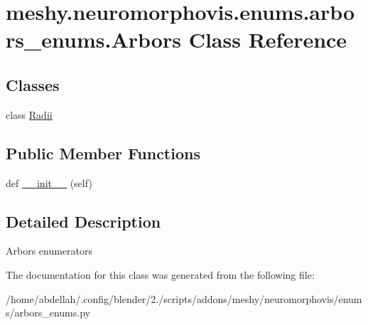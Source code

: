 \hypertarget{classmeshy_1_1neuromorphovis_1_1enums_1_1arbors__enums_1_1Arbors}{}\section{meshy.\+neuromorphovis.\+enums.\+arbors\+\_\+enums.\+Arbors Class Reference}
\label{classmeshy_1_1neuromorphovis_1_1enums_1_1arbors__enums_1_1Arbors}


 


\subsection*{Classes}
\begin{DoxyCompactItemize}
\item 
class \hyperlink{classmeshy_1_1neuromorphovis_1_1enums_1_1arbors__enums_1_1Arbors_1_1Radii}{Radii}
\end{DoxyCompactItemize}
\subsection*{Public Member Functions}
\begin{DoxyCompactItemize}
\item 
def \hyperlink{classmeshy_1_1neuromorphovis_1_1enums_1_1arbors__enums_1_1Arbors_ae43989d5fdf0a995901c82d4fcba610d}{\+\_\+\+\_\+init\+\_\+\+\_\+} (self)\hypertarget{classmeshy_1_1neuromorphovis_1_1enums_1_1arbors__enums_1_1Arbors_ae43989d5fdf0a995901c82d4fcba610d}{}\label{classmeshy_1_1neuromorphovis_1_1enums_1_1arbors__enums_1_1Arbors_ae43989d5fdf0a995901c82d4fcba610d}

\end{DoxyCompactItemize}


\subsection{Detailed Description}


\begin{DoxyVerb}Arbors enumerators
\end{DoxyVerb}
 

The documentation for this class was generated from the following file\+:\begin{DoxyCompactItemize}
\item 
/home/abdellah/.\+config/blender/2./scripts/addons/meshy/neuromorphovis/enums/arbors\+\_\+enums.\+py\end{DoxyCompactItemize}
